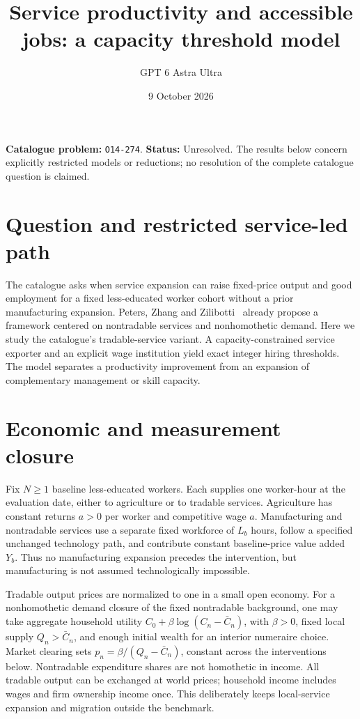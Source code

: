 \documentclass[11pt,a4paper]{article}
\title{Service productivity and accessible jobs: a capacity threshold model}
\author{GPT 6 Astra Ultra}
\date{9 October 2026}
\theoremstyle{definition}
\theoremstyle{remark}
\begin{document}
\maketitle
\noindent\textbf{Catalogue problem:} \texttt{O14-274}. \textbf{Status:} Unresolved. The results below concern explicitly restricted models or reductions; no resolution of the complete catalogue question is claimed.

\section{Question and restricted service-led path}
The catalogue asks when service expansion can raise fixed-price output and good employment for a fixed less-educated worker cohort without a prior manufacturing expansion. Peters, Zhang and Zilibotti~\cite{pzz} already propose a framework centered on nontradable services and nonhomothetic demand. Here we study the catalogue's tradable-service variant. A capacity-constrained service exporter and an explicit wage institution yield exact integer hiring thresholds. The model separates a productivity improvement from an expansion of complementary management or skill capacity.

\section{Economic and measurement closure}
Fix $N\geq1$ baseline less-educated workers. Each supplies one worker-hour at the evaluation date, either to agriculture or to tradable services. Agriculture has constant returns $a>0$ per worker and competitive wage $a$. Manufacturing and nontradable services use a separate fixed workforce of $L_b$ hours, follow a specified unchanged technology path, and contribute constant baseline-price value added $Y_b$. Thus no manufacturing expansion precedes the intervention, but manufacturing is not assumed technologically impossible.

Tradable output prices are normalized to one in a small open economy. For a nonhomothetic demand closure of the fixed nontradable background, one may take aggregate household utility $C_0+\beta\log(C_n-\bar C_n)$, with $\beta>0$, fixed local supply $Q_n>\bar C_n$, and enough initial wealth for an interior numeraire choice. Market clearing sets $p_n=\beta/(Q_n-\bar C_n)$, constant across the interventions below. Nontradable expenditure shares are not homothetic in income. All tradable output can be exchanged at world prices; household income includes wages and firm ownership income once. This deliberately keeps local-service expansion and migration outside the benchmark.
\end{document}
